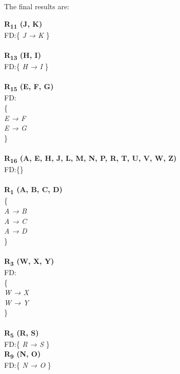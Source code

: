 The final results are:\\

\begin{adjustwidth}{2cm}{}
\textbf{R\textsubscript{11} (J, K)}\\
FD:\{
\textit{ 
J → K 
}
\} \\ \\

\noindent
\textbf{R\textsubscript{13} (H, I)}\\
FD:\{
\textit{ 
H → I 
}
\} \\ \\

\noindent
\textbf{R\textsubscript{15} (E, F, G)}\\
FD:\\
\{\\
\textit{ 
E → F\\
E → G\\
}
\} \\ \\

\noindent
\textbf{R\textsubscript{16} (A, E, H, J, L, M, N, P, R, T, U, V, W, Z)}\\
FD:\{\} \\ \\

\noindent
\textbf{R\textsubscript{1} (A, B, C, D)}\\
\{\\ 
\textit{
A → B\\
A → C\\
A → D\\
} 
\}\\ \\

\noindent
\textbf{R\textsubscript{3} (W, X, Y)}\\
FD:\\
\{\\
\textit{ 
W → X\\
W → Y\\ 
}
\} \\ \\

\noindent
\textbf{R\textsubscript{5} (R, S)}\\
FD:\{
\textit{ 
R → S 
}
\} \\

\noindent
\textbf{R\textsubscript{9} (N, O)}\\
FD:\{
\textit{ 
N → O 
}
\} \\


\end{adjustwidth} 




\clearpage